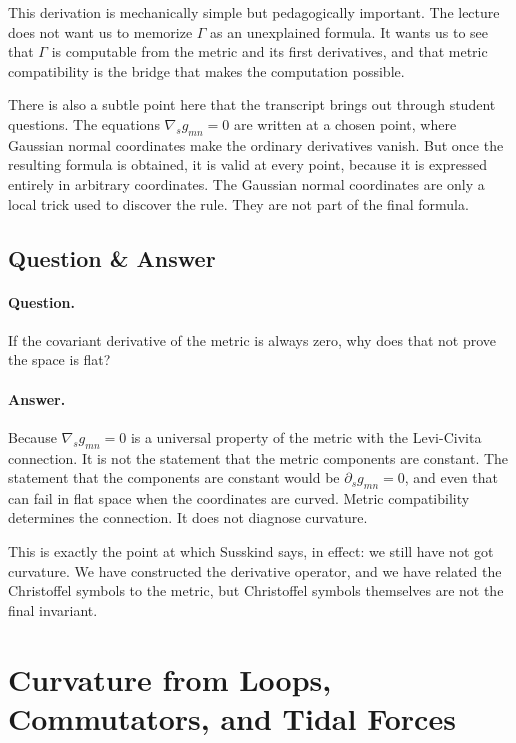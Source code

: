 This derivation is mechanically simple but pedagogically important. The lecture does not want us to memorize \(\Gamma\) as an unexplained formula. It wants us to see that \(\Gamma\) is computable from the metric and its first derivatives, and that metric compatibility is the bridge that makes the computation possible.

There is also a subtle point here that the transcript brings out through student questions. The equations \(\nabla_s g_{mn}=0\) are written at a chosen point, where Gaussian normal coordinates make the ordinary derivatives vanish. But once the resulting formula is obtained, it is valid at every point, because it is expressed entirely in arbitrary coordinates. The Gaussian normal coordinates are only a local trick used to discover the rule. They are not part of the final formula.

\subsection{Question \& Answer}

\paragraph{Question.} If the covariant derivative of the metric is always zero, why does that not prove the space is flat?

\paragraph{Answer.} Because \(\nabla_s g_{mn}=0\) is a universal property of the metric with the Levi-Civita connection. It is not the statement that the metric components are constant. The statement that the components are constant would be \(\partial_s g_{mn}=0\), and even that can fail in flat space when the coordinates are curved. Metric compatibility determines the connection. It does not diagnose curvature.

This is exactly the point at which Susskind says, in effect: we still have not got curvature. We have constructed the derivative operator, and we have related the Christoffel symbols to the metric, but Christoffel symbols themselves are not the final invariant.

\section{Curvature from Loops, Commutators, and Tidal Forces}

